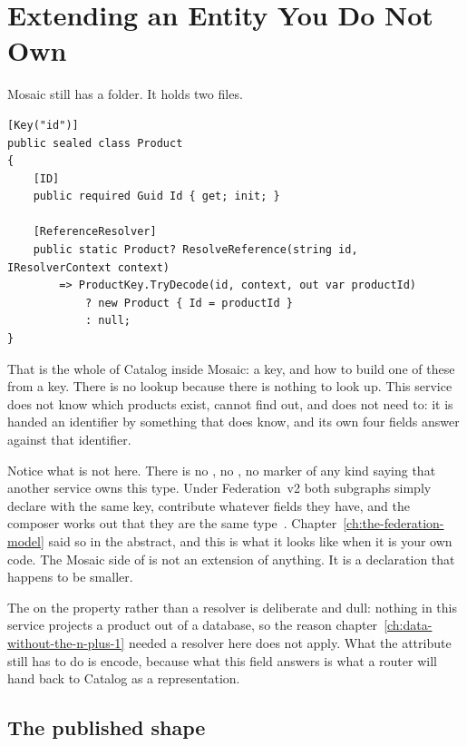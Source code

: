 \section{Extending an Entity You Do Not Own}
\label{sec:ch08-extending-a-foreign-entity}
%

Mosaic still has a  folder. It holds two files.

\begin{verbatim}
[Key("id")]
public sealed class Product
{
    [ID]
    public required Guid Id { get; init; }

    [ReferenceResolver]
    public static Product? ResolveReference(string id, IResolverContext context)
        => ProductKey.TryDecode(id, context, out var productId)
            ? new Product { Id = productId }
            : null;
}
\end{verbatim}

That is the whole of Catalog inside Mosaic: a key, and how to build one of these
from a key. There is no lookup because there is nothing to look up. This service
does not know which products exist, cannot find out, and does not need to: it is
handed an identifier by something that does know, and its own four fields answer
against that identifier.

%
Notice what is not here. There is no , no , no
marker of any kind saying that another service owns this type. Under
Federation~v2 both subgraphs simply declare  with the same key,
contribute whatever fields they have, and the composer works out that they are
the same type~\autocite{apollo2026entities}.
Chapter~\ref{ch:the-federation-model} said so in the abstract, and this is what
it looks like when it is your own code. The Mosaic side of  is not
an extension of anything. It is a declaration that happens to be smaller.

%
The \code{[ID]} on the property rather than a resolver is deliberate and dull:
nothing in this service projects a product out of a database, so the reason
chapter~\ref{ch:data-without-the-n-plus-1} needed a resolver here does not
apply. What the attribute still has to do is encode, because what this field
answers is what a router will hand back to Catalog as a representation.

\subsection*{The published shape}

